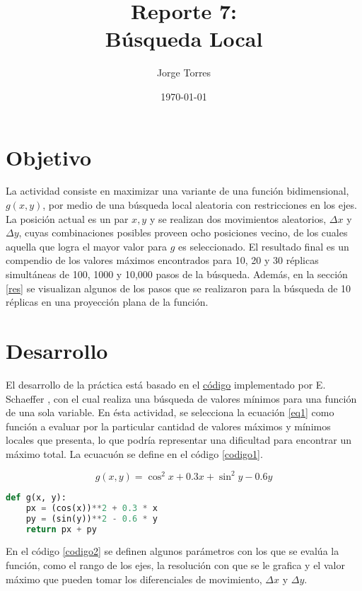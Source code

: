 \documentclass{article}
\title{Reporte 7:\\B\'usqueda Local}
\author{Jorge Torres}
\date{\today}
\begin{document}
\maketitle

\section{Objetivo}\label{obj}
La actividad consiste en maximizar una variante de una funci\'on bidimensional, $g(x, y)$, por medio de una b\'usqueda local aleatoria con restricciones en los ejes. La posición actual es un par $x, y$ y se realizan dos movimientos aleatorios, $\Delta x$ y $\Delta y$, cuyas combinaciones posibles proveen ocho posiciones vecino, de los cuales aquella que logra el mayor valor para $g$ es seleccionado. El resultado final es un compendio de los valores m\'aximos encontrados para 10, 20 y 30 r\'eplicas simult\'aneas de 100, 1000 y 10,000 pasos de la b\'usqueda. Adem\'as, en la secci\'on \ref{res} se visualizan algunos de los pasos que se realizaron para la b\'usqueda de 10 r\'eplicas en una proyecci\'on plana de la funci\'on.

\section{Desarrollo}\label{des}
El desarrollo de la pr\'actica est\'a basado en el \href{https://github.com/satuelisa/Simulation/blob/master/LocalSearch/minimize1D.py}{c\'odigo} implementado por E. Schaeffer \cite{elisa1}, con el cual realiza una b\'usqueda de valores m\'inimos para una funci\'on de una sola variable. En \'esta actividad, se selecciona la ecuaci\'on \ref{eq1} como funci\'on a evaluar por la particular cantidad de valores m\'aximos y m\'inimos locales que presenta, lo que podr\'ia representar una dificultad para encontrar un m\'aximo total. La ecuacu\'on se define en el c\'odigo \ref{codigo1}.

\begin{equation}\label{eq1}
    g(x, y) = \cos^2{x} + 0.3x + \sin^2{y} - 0.6y
\end{equation}

\begin{lstlisting}[caption=Funci\'on a Evaluar, label=codigo1, language=Python]
def g(x, y):
    px = (cos(x))**2 + 0.3 * x
    py = (sin(y))**2 - 0.6 * y
    return px + py
\end{lstlisting}

En el c\'odigo \ref{codigo2} se definen algunos par\'ametros con los que se eval\'ua la funci\'on, como el rango de los ejes, la resoluci\'on con que se le grafica y el valor m\'aximo que pueden tomar los diferenciales de movimiento, $\Delta x$ y $\Delta y$.
\end{document}
